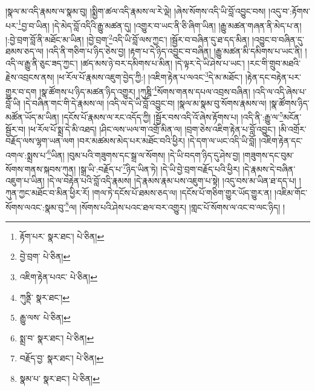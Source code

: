 །སྣལ་མ་འདི་རྣམས་ལ་སྣམ་བུ། །སྨྱིག་ཚལ་འདི་རྣམས་ལ་རེ་ལྡེ། །ཞེས་སོགས་འདི་ཡི་བློ་འབྱུང་བས། །འདུ་བ་:རྟོགས་པར་\footnote{རྟོག་པར་  སྣར་ཐང་།  པེ་ཅིན། }བྱ་བ་ཡིན། །དེ་མེད་བློ་འདིའི་རྒྱུ་མཚན་དུ། །འགྱུར་བ་ཡང་ནི་ཅི་ཞིག་ཡིན། །རྒྱུ་མཚན་གཞན་ནི་མེད་པ་ན། །:བྱེ་བྲག་བློ་ནི་མཐོང་མ་ཡིན། །བྱེ་བྲག་\footnote{བྱེ་བྲག་  པེ་ཅིན། }འདི་ཡི་བློ་ལས་ཀྱང་། །སྦྱོར་བ་བཞིན་དུ་ཐ་དད་མིན། །འབྱུང་བ་བཞིན་དུ་ཐམས་ཅད་ལ། །འདི་ནི་གཅིག་པ་ཉིད་ཅེས་བྱ། །རྟག་པ་དེ་ཉིད་འབྱུང་བ་བཞིན། །རྒྱུ་མཚན་མི་དམིགས་པ་ཡང་ནི། །འདི་ལ་རྒྱུ་ནི་ཅུང་ཟད་ཀྱང་། །ཚད་མས་ཉེ་བར་དམིགས་པ་མིན། །དེ་ལྟར་དེ་ཡི་ཤེས་པ་ཡང་། །རང་གི་གྲུབ་མཐའི་རྗེས་འབྲངས་ནས། །ཕ་རོལ་པོ་རྣམས་འཇུག་བྱེད་ཀྱི:། །འཇིག་རྟེན་པ་ལའང་\footnote{འཇིག་རྟེན་པའང་  པེ་ཅིན། }དེ་མ་མཐོང་། །རྟེན་དང་བརྟེན་པར་གྱུར་བ་དག །སྣ་ཚོགས་པ་ཉིད་མཚན་ཉིད་འགྱུར། །ཀུཎྜི་\footnote{ཀུནྡི་  སྣར་ཐང་། }སོགས་གནས་དཔལ་འབྲས་བཞིན། །འདི་ལ་འདི་ཞེས་པ་བློ་ཡི། །དེ་བཞིན་གང་གི་དེ་རྣམས་ལ། །འདི་ལ་དེ་ཡི་བློ་འབྱུང་བ། །སྣལ་མ་སྣམ་བུ་སོགས་རྣམས་ལ། །སྣ་ཚོགས་ཉིད་མཚོན་ཡོད་མ་ཡིན། །དངོས་པོ་རྣམས་ལ་རང་འདོད་ཀྱི། །སྦྱོར་བས་འདི་འོ་ཞེས་རྟོགས་པ། །འདི་ནི་:རྒྱུ་ལ་\footnote{རྒྱུ་ལས་  པེ་ཅིན། }མངོན་སྦྱོར་བ། །ཕ་རོལ་པོ་སྨྲ་དེ་མི་འཐད། །ཤིང་ལས་ཡལ་ག་འགྲོ་མིན་ལ། །བྲག་ཅེས་འཇིག་རྟེན་པ་བློ་འབྱུང་། །མི་འགྲོར་བརྗོད་ལས་ལྷག་ཡན་ལག །བར་མཚམས་མེད་པར་མཐོང་བའི་ཕྱིར། །དེ་དག་ལ་ཡང་འདི་ཡི་བློ། །འཇིག་རྟེན་དང་འགལ་:སྨྲས་པ་\footnote{སྨྲ་བ་  སྣར་ཐང་།  པེ་ཅིན། }ཡིན། །བུམ་པའི་གཟུགས་དང་སྒྲ་ལ་སོགས། །དེ་ཡི་བདག་ཉིད་དུ་ཤེས་བྱ། །གཟུགས་དང་བུམ་སོགས་གནས་སྐབས་ཀུན། །སྒྲ་ཡི་:བརྗོད་པ་\footnote{བརྗོད་བྱ་  སྣར་ཐང་།  པེ་ཅིན། }ཉིད་ཡིན་ཏེ། །དེ་ཡི་བྱེ་བྲག་བརྗོད་པའི་ཕྱིར། །དེ་རྣམས་དེ་བཞིན་འཇུག་པ་ཡིན། །དེ་ལ་བརྟེན་པའི་བློ་འདི་རྣམས། །དེ་རྣམས་རྣམ་པས་འཇུག་པ་སྟེ། །འདུ་བས་མ་ཡིན་ཐ་དད་པ། །ཀུན་ཀྱང་མཐོང་བ་མིན་ཕྱིར་རོ། །གལ་ཏེ་དངོས་པོ་ཐམས་ཅད་ལ། །དངོས་པོ་གཅིག་གྱུར་ཡོད་གྱུར་ན། །འཇིམ་གོང་སོགས་ལའང་:སྣམ་བུ་\footnote{སྣམ་པ་  སྣར་ཐང་།  པེ་ཅིན། }ལ། །སོགས་པའི་ཤེས་པའང་ཐལ་བར་འགྱུར། །གླང་པོ་སོགས་ལ་འང་བ་ལང་ཉིད། །
